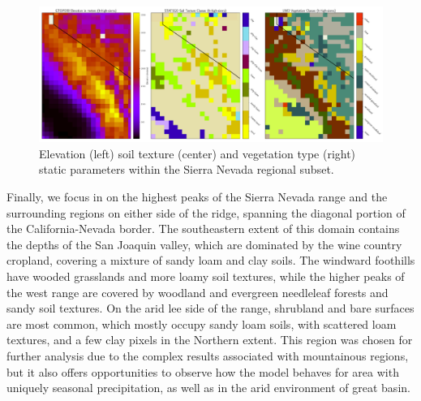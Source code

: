 \begin{figure}[h!]
    \centering

    \includegraphics[width=.99\linewidth,draft=false]{figures/lt-static/static_all-3_high-sierra.png}

    \caption{Elevation (left) soil texture (center) and vegetation type (right) static parameters within the Sierra Nevada regional subset.}
    \label{lt_static_high-sierra}
\end{figure}

Finally, we focus in on the highest peaks of the Sierra Nevada range and the surrounding regions on either side of the ridge, spanning the diagonal portion of the California-Nevada border. The southeastern extent of this domain contains the depths of the San Joaquin valley, which are dominated by the wine country cropland, covering a mixture of sandy loam and clay soils. The windward foothills have wooded grasslands and more loamy soil textures, while the higher peaks of the west range are covered by woodland and evergreen needleleaf forests and sandy soil textures. On the arid lee side of the range, shrubland and bare surfaces are most common, which mostly occupy sandy loam soils, with scattered loam textures, and a few clay pixels in the Northern extent. This region was chosen for further analysis due to the complex results associated with mountainous regions, but it also offers opportunities to observe how the model behaves for area with uniquely seasonal precipitation, as well as in the arid environment of great basin.

